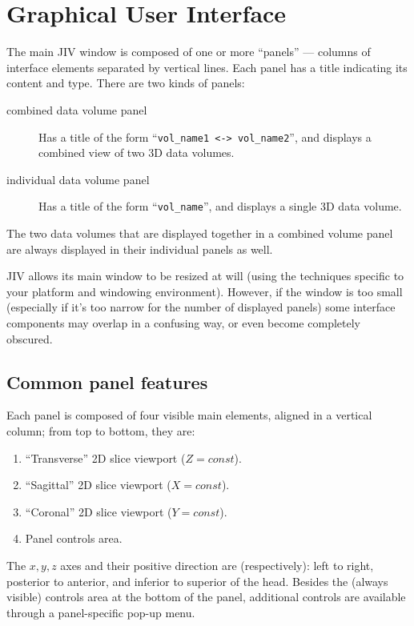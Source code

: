 %
%
%

\section{Graphical User Interface}
\label{sec:gui}

The main JIV window is composed of one or more ``panels'' --- columns
of interface elements separated by vertical lines.  Each panel has a
title indicating its content and type. There are two kinds of panels:
\begin{description}
\item[combined data volume panel] Has a title of the form
  ``\verb+vol_name1 <-> vol_name2+'', and displays a combined view of
  two 3D data volumes.
\item[individual data volume panel] Has a title of the form
  ``\verb+vol_name+'', and displays a single 3D data volume.
\end{description}
The two data volumes that are displayed together in a combined volume
panel are always displayed in their individual panels as well.

JIV allows its main window to be resized at will (using the techniques
specific to your platform and windowing environment). However, if the
window is too small (especially if it's too narrow for the number of
displayed panels) some interface components may overlap in a confusing
way, or even become completely obscured.

\subsection{Common panel features}
\label{sec:common-features}
Each panel is composed of four visible main elements, aligned in a
vertical column; from top to bottom, they are:
\begin{enumerate}
\item ``Transverse'' 2D slice viewport ($Z = const$).
\item ``Sagittal'' 2D slice viewport ($X = const$).
\item ``Coronal'' 2D slice viewport ($Y = const$).
\item Panel controls area.
\end{enumerate}
The $x, y, z$ axes and their positive direction are (respectively):
left to right, posterior to anterior, and inferior to superior of the
head.  Besides the (always visible) controls area at the bottom of the
panel, additional controls are available through a panel-specific
pop-up menu.

